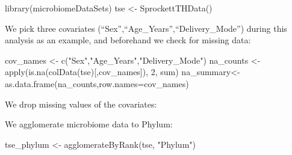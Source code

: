 \documentclass[
]{book}
\newenvironment{Shaded}{\begin{snugshade}}{\end{snugshade}}
\newcommand{\AttributeTok}[1]{\textcolor[rgb]{0.77,0.63,0.00}{#1}}
\newcommand{\DecValTok}[1]{\textcolor[rgb]{0.00,0.00,0.81}{#1}}
\newcommand{\FunctionTok}[1]{\textcolor[rgb]{0.00,0.00,0.00}{#1}}
\newcommand{\NormalTok}[1]{#1}
\newcommand{\OtherTok}[1]{\textcolor[rgb]{0.56,0.35,0.01}{#1}}
\newcommand{\SpecialCharTok}[1]{\textcolor[rgb]{0.00,0.00,0.00}{#1}}
\newcommand{\StringTok}[1]{\textcolor[rgb]{0.31,0.60,0.02}{#1}}
\begin{document}
\begin{Shaded}
\begin{Highlighting}[]
\FunctionTok{library}\NormalTok{(microbiomeDataSets)}
\NormalTok{tse }\OtherTok{\textless{}{-}} \FunctionTok{SprockettTHData}\NormalTok{()}
\end{Highlighting}
\end{Shaded}

We pick three covariates (``Sex'',``Age\_Years'',``Delivery\_Mode'') during this
analysis as an example, and beforehand we check for missing data:

\begin{Shaded}
\begin{Highlighting}[]
\NormalTok{cov\_names }\OtherTok{\textless{}{-}} \FunctionTok{c}\NormalTok{(}\StringTok{"Sex"}\NormalTok{,}\StringTok{"Age\_Years"}\NormalTok{,}\StringTok{"Delivery\_Mode"}\NormalTok{)}
\NormalTok{na\_counts }\OtherTok{\textless{}{-}} \FunctionTok{apply}\NormalTok{(}\FunctionTok{is.na}\NormalTok{(}\FunctionTok{colData}\NormalTok{(tse)[,cov\_names]), }\DecValTok{2}\NormalTok{, sum)}
\NormalTok{na\_summary}\OtherTok{\textless{}{-}}\FunctionTok{as.data.frame}\NormalTok{(na\_counts,}\AttributeTok{row.names=}\NormalTok{cov\_names)}
\end{Highlighting}
\end{Shaded}

We drop missing values of the covariates:

\begin{Shaded}
\end{Shaded}

We agglomerate microbiome data to Phylum:

\begin{Shaded}
\begin{Highlighting}[]
\NormalTok{tse\_phylum }\OtherTok{\textless{}{-}} \FunctionTok{agglomerateByRank}\NormalTok{(tse, }\StringTok{"Phylum"}\NormalTok{)}
\end{Highlighting}
\end{Shaded}
\end{document}
